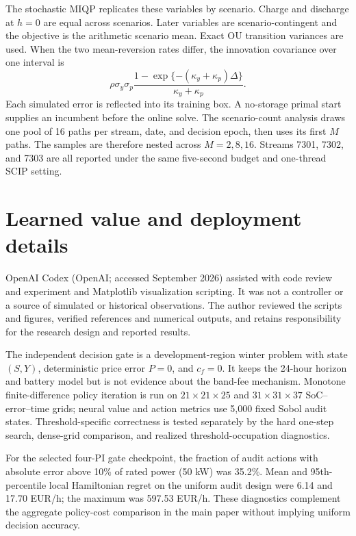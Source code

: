 \documentclass[preprint,11pt]{elsarticle}
\begin{document}
The stochastic MIQP replicates these variables by scenario. Charge and
discharge at $h=0$ are equal across scenarios. Later variables are
scenario-contingent and the objective is the arithmetic scenario mean. Exact
OU transition variances are used. When the two mean-reversion rates differ,
the innovation covariance over one interval is
\begin{equation}
 \rho\sigma_y\sigma_p
 \frac{1-\exp\{-(\kappa_y+\kappa_p)\Delta\}}
 {\kappa_y+\kappa_p}.
\end{equation}
Each simulated error is reflected into its training box. A no-storage primal
start supplies an incumbent before the online solve.
The scenario-count analysis draws one pool of 16 paths per stream,
date, and decision epoch, then uses its first $M$ paths. The samples are
therefore nested across $M=2,8,16$. Streams 7301, 7302, and 7303 are all
reported under the same five-second budget and one-thread SCIP setting.

\section{Learned value and deployment details}

OpenAI Codex (OpenAI; accessed September 2026) assisted with code review and
experiment and Matplotlib visualization scripting. It was not a controller or
a source of simulated or historical observations. The author reviewed the
scripts and figures, verified references and numerical outputs, and retains
responsibility for the research design and reported results.

The independent decision gate is a development-region winter problem with
state $(S,Y)$, deterministic price error $P=0$, and $c_f=0$. It keeps the
24-hour horizon and battery model but is not evidence about the band-fee
mechanism. Monotone finite-difference policy iteration is run on
$21\times21\times25$ and $31\times31\times37$ SoC--error--time grids; neural
value and action metrics use 5,000 fixed Sobol audit states. Threshold-specific
correctness is tested separately by the hard one-step search, dense-grid
comparison, and realized threshold-occupation diagnostics.

For the selected four-PI gate checkpoint, the fraction of audit actions with
absolute error above 10\% of rated power (50 kW) was 35.2\%.
Mean and 95th-percentile local Hamiltonian regret on the uniform audit design
were 6.14 and 17.70 EUR/h; the maximum was 597.53 EUR/h.
These diagnostics complement the aggregate policy-cost comparison in the
main paper without implying uniform decision accuracy.
\end{document}
